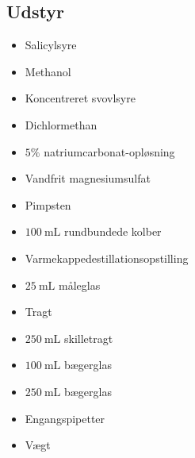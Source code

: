 \subsection*{Udstyr}
\begin{multicols}{2}
    \begin{itemize}
        \item Salicylsyre
        \item Methanol
        \item Koncentreret svovlsyre
        \item Dichlormethan
        \item $5\%$ natriumcarbonat-opløsning
        \item Vandfrit magnesiumsulfat
        \item Pimpsten
        \item $100\ \unit{\milli\liter}$ rundbundede kolber
        \item Varmekappedestillationsopstilling
        \item $25\ \unit{\milli\liter}$ måleglas
        \item Tragt
        \item $250\ \unit{\milli\liter}$ skilletragt
        \item $100\ \unit{\milli\liter}$ bægerglas
        \item $250\ \unit{\milli\liter}$ bægerglas
        \item Engangspipetter
        \item Vægt
    \end{itemize}    
\end{multicols}
